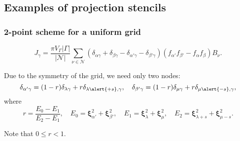 \documentclass[mathserif]{beamer} %
\newcommand{\bxi}{\boldsymbol{\xi}}
\newcommand{\Nu}{\mathcal{N}}
\begin{document}
\subsection{Examples of projection stencils}

\begin{frame}
    \frametitle{2-point scheme for a uniform grid}
    \begin{equation}\label{eq:discrete_symm_ci_uniform}
        J_\gamma = \frac{\pi V_\Gamma|\Gamma|}{|\Nu|}
            \sum_{\nu\in\Nu} \left(
                \delta_{\alpha\gamma} + \delta_{\beta\gamma}
                - \delta_{\alpha'\gamma} - \delta_{\beta'\gamma}
            \right)\left( f_{\alpha'} f_{\beta'} - f_{\alpha} f_{\beta} \right)B_\nu.
    \end{equation}
    \vspace{-20pt}\pause

    Due to the symmetry of the grid, we need only two nodes:
    \begin{equation}\label{eq:uniform_projection}
        \delta_{\alpha'\gamma} = (1-r)\delta_{\lambda\gamma} + r\delta_{\lambda\alert{+s},\gamma}, \quad
        \delta_{\beta'\gamma} = (1-r)\delta_{\mu\gamma} + r\delta_{\mu\alert{-s},\gamma},
    \end{equation}
    where
    \begin{equation}\label{eq:r_uniform}
        r = \frac{E_0-E_1}{E_2-E_1}, \quad
        E_0 = \bxi_{\alpha'}^2 + \bxi_{\beta'}^2, \quad
        E_1 = \bxi_{\lambda}^2 + \bxi_{\mu}^2, \quad
        E_2 = \bxi_{\lambda+s}^2 + \bxi_{\mu-s}^2.
    \end{equation}
    \vspace{-20pt}\pause

    Note that \(0\leq r < 1\).
\end{frame}
\end{document}
